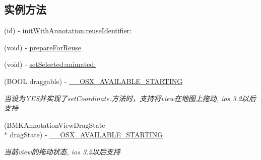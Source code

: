 \subsection*{实例方法}
\begin{DoxyCompactItemize}
\item 
(id) -\/ \hyperlink{interface_b_m_k_annotation_view_ae2b46541ec52b7d8ee0857a9ec369f5f}{init\-With\-Annotation\-:reuse\-Identifier\-:}
\item 
(void) -\/ \hyperlink{interface_b_m_k_annotation_view_ae74849e624ac0cfaa7695b7cc97ddf23}{prepare\-For\-Reuse}
\item 
(void) -\/ \hyperlink{interface_b_m_k_annotation_view_abc0e70812fb7b3bccdbb574ddb578c21}{set\-Selected\-:animated\-:}
\item 
\hypertarget{interface_b_m_k_annotation_view_a54d15e7cc4e89d89d2233ec7fc408ad9}{(B\-O\-O\-L draggable) -\/ \hyperlink{interface_b_m_k_annotation_view_a54d15e7cc4e89d89d2233ec7fc408ad9}{\-\_\-\-\_\-\-O\-S\-X\-\_\-\-A\-V\-A\-I\-L\-A\-B\-L\-E\-\_\-\-S\-T\-A\-R\-T\-I\-N\-G}}\label{interface_b_m_k_annotation_view_a54d15e7cc4e89d89d2233ec7fc408ad9}

\begin{DoxyCompactList}\small\item\em 当设为\-Y\-E\-S并实现了set\-Coordinate\-:方法时，支持将view在地图上拖动, ios 3.\-2以后支持 \end{DoxyCompactList}\item 
\hypertarget{interface_b_m_k_annotation_view_a623e818d48c983176a6553104b21a34c}{(B\-M\-K\-Annotation\-View\-Drag\-State \\*
drag\-State) -\/ \hyperlink{interface_b_m_k_annotation_view_a623e818d48c983176a6553104b21a34c}{\-\_\-\-\_\-\-O\-S\-X\-\_\-\-A\-V\-A\-I\-L\-A\-B\-L\-E\-\_\-\-S\-T\-A\-R\-T\-I\-N\-G}}\label{interface_b_m_k_annotation_view_a623e818d48c983176a6553104b21a34c}

\begin{DoxyCompactList}\small\item\em 当前view的拖动状态, ios 3.\-2以后支持 \end{DoxyCompactList}\end{DoxyCompactItemize}

